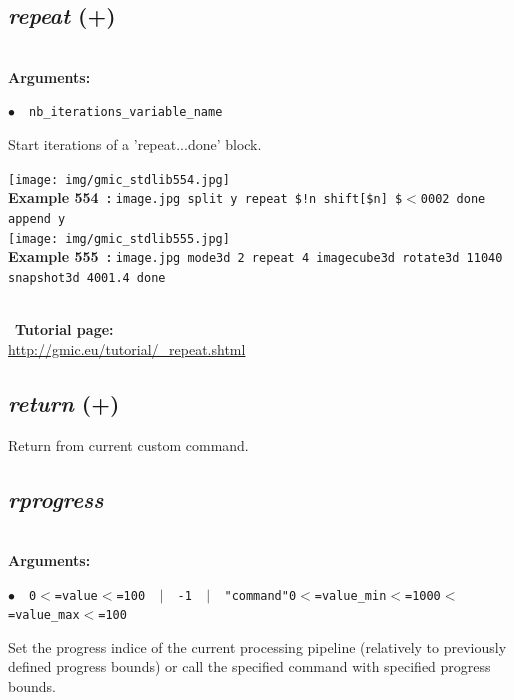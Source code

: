 \documentclass[a4paper,10.5pt,twoside]{book}
\def\comma{\discretionary{,}{}{,}}
\newcommand{\Cb}[1]{\textcolor{cb}{#1}}
\begin{document}
\subsection{\emph{repeat} (+)}\vspace*{-0.7em}
~\\\textbf{\Cb{Arguments: }}\begin{flushleft}
{\small \Cb{\hspace*{0.5cm}$\bullet$~~\texttt{nb\_iterations{\comma}\_variable\_name}}}\end{flushleft}
Start iterations of a 'repeat...done' block.
\begin{center}\texttt{[image: img/gmic\_stdlib554.jpg]}\\
{\footnotesize \textbf{Example 554~:} \texttt{image.jpg split y repeat \$!{\comma}n shift[\$n] \$$<${\comma}0{\comma}0{\comma}0{\comma}2 done append y}}
\\\texttt{[image: img/gmic\_stdlib555.jpg]}\\
{\footnotesize \textbf{Example 555~:} \texttt{image.jpg mode3d 2 repeat 4 imagecube3d rotate3d 1{\comma}1{\comma}0{\comma}40 snapshot3d 400{\comma}1.4 done}}
\end{center}
~\\
~\textbf{Tutorial page: }\\\url{http://gmic.eu/tutorial/\_repeat.shtml}


\subsection{\emph{return} (+)}\vspace*{-0.7em}
Return from current custom command.


\subsection{\emph{rprogress} }\vspace*{-0.7em}
~\\\textbf{\Cb{Arguments: }}\begin{flushleft}
{\small \Cb{\hspace*{0.5cm}$\bullet$~~\texttt{0$<$=value$<$=100 ~$|$~ -1 ~$|$~ "command"{\comma}0$<$=value\_min$<$=100{\comma}0$<$=value\_ma\-x$<$=100}}}\end{flushleft}
Set the progress indice of the current processing pipeline (relatively to
previously defined progress bounds){\comma} or call the specified command with
specified progress bounds.
\end{document}
